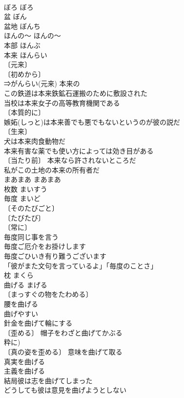 \documentclass[8pt]{extreport}
\begin{document}
\begin{CJK}{UTF8}{min}
\\	ぼろ	ぼろ	
\\	盆	ぼん	
\\	盆地	ぼんち	
\\	ほんの～	ほんの～	
\\	本部	ほんぶ	
\\	本来	ほんらい	
\\	〔元来〕
\\	〔初めから〕
\\	⇒がんらい(元来) 本来の 
\\	この鉄道は本来鉄鉱石運搬のために敷設された 
\\	当校は本来女子の高等教育機関である 
\\	〔本質的に〕
\\	嫉妬(しっと)は本来善でも悪でもないというのが彼の説だ 
\\	〔生来〕
\\	犬は本来肉食動物だ 
\\	本来有害な薬でも使い方によっては効き目がある 
\\	〔当たり前〕 本来なら許されないところだ 
\\	私がこの土地の本来の所有者だ 
\\	まあまあ	まあまあ	
\\	枚数	まいすう	
\\	毎度	まいど	
\\	〔そのたびごと〕
\\	〔たびたび〕
\\	〔常に〕
\\	毎度同じ事を言う 
\\	毎度ご厄介をお掛けします 
\\	毎度ごひいき有り難うございます 
\\	「彼がまた文句を言っているよ」「毎度のことさ」 
\\	枕	まくら	
\\	曲げる	まげる	
\\	〔まっすぐの物をたわめる〕
\\	腰を曲げる 
\\	曲げやすい 
\\	針金を曲げて輪にする 
\\	〔歪める〕 帽子をわざと曲げてかぶる 
\\	粋に) 
\\	〔真の姿を歪める〕 意味を曲げて取る 
\\	真実を曲げる 
\\	主義を曲げる 
\\	結局彼は志を曲げてしまった 
\\	どうしても彼は意見を曲げようとしない 

\end{CJK}
\end{document}
